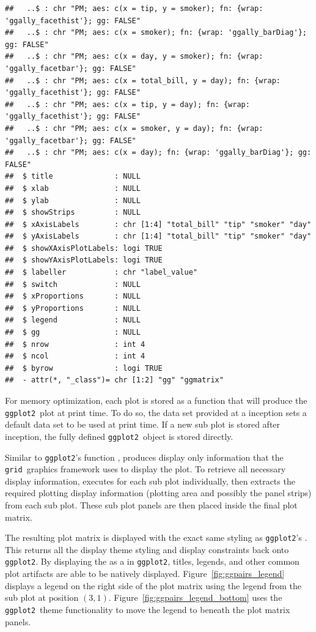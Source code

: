 \documentclass[stat,dissertation]{puthesis}\usepackage[]{graphicx}\usepackage{xcolor}
\makeatletter
\newenvironment{kframe}{%
 \def\at@end@of@kframe{}%
 \ifinner\ifhmode%
  \def\at@end@of@kframe{\end{minipage}}%
  \begin{minipage}{\columnwidth}%
 \fi\fi%
 \def\FrameCommand##1{\hskip\@totalleftmargin \hskip-\fboxsep
 \colorbox{shadecolor}{##1}\hskip-\fboxsep
     \hskip-\linewidth \hskip-\@totalleftmargin \hskip\columnwidth}%
 \MakeFramed {\advance\hsize-\width
   \@totalleftmargin\z@ \linewidth\hsize
   \@setminipage}}%
 {\par\unskip\endMakeFramed%
 \at@end@of@kframe}
\newenvironment{knitrout}{}{} %
\renewenvironment{knitrout}{\setstretch{1}}{}
\newcommand{\pkg}[1]{\texttt{#1}}
\newcommand{\ggplot}{\pkg{ggplot2}}
\makeatother
\begin{document}
\begin{knitrout}
\begin{kframe}
\begin{verbatim}
##   ..$ : chr "PM; aes: c(x = tip, y = smoker); fn: {wrap: 'ggally_facethist'}; gg: FALSE"
##   ..$ : chr "PM; aes: c(x = smoker); fn: {wrap: 'ggally_barDiag'}; gg: FALSE"
##   ..$ : chr "PM; aes: c(x = day, y = smoker); fn: {wrap: 'ggally_facetbar'}; gg: FALSE"
##   ..$ : chr "PM; aes: c(x = total_bill, y = day); fn: {wrap: 'ggally_facethist'}; gg: FALSE"
##   ..$ : chr "PM; aes: c(x = tip, y = day); fn: {wrap: 'ggally_facethist'}; gg: FALSE"
##   ..$ : chr "PM; aes: c(x = smoker, y = day); fn: {wrap: 'ggally_facetbar'}; gg: FALSE"
##   ..$ : chr "PM; aes: c(x = day); fn: {wrap: 'ggally_barDiag'}; gg: FALSE"
##  $ title              : NULL
##  $ xlab               : NULL
##  $ ylab               : NULL
##  $ showStrips         : NULL
##  $ xAxisLabels        : chr [1:4] "total_bill" "tip" "smoker" "day"
##  $ yAxisLabels        : chr [1:4] "total_bill" "tip" "smoker" "day"
##  $ showXAxisPlotLabels: logi TRUE
##  $ showYAxisPlotLabels: logi TRUE
##  $ labeller           : chr "label_value"
##  $ switch             : NULL
##  $ xProportions       : NULL
##  $ yProportions       : NULL
##  $ legend             : NULL
##  $ gg                 : NULL
##  $ nrow               : int 4
##  $ ncol               : int 4
##  $ byrow              : logi TRUE
##  - attr(*, "_class")= chr [1:2] "gg" "ggmatrix"
\end{verbatim}
\end{kframe}
\end{knitrout}

For memory optimization, each plot is stored as a function that will produce the \ggplot~plot at print time.  To do so, the data set provided at a  inception sets a default data set to be used at print time.  If a new sub plot is stored after inception, the fully defined \ggplot~object is stored directly.

Similar to \ggplot's function ,  produces display only information that the \pkg{grid}~graphics framework uses to display the plot. To retrieve all necessary display information,  executes  for each sub plot individually, then extracts the required plotting display information (plotting area and possibly the panel strips) from each sub plot.  These sub plot panels are then placed inside the final plot matrix.

The resulting plot matrix is displayed with the exact same styling as \ggplot's . This returns all the display theme styling and display constraints back onto \ggplot.  By displaying the  as a  in \ggplot, titles, legends, and other common plot artifacts are able to be natively displayed.   Figure~\ref{fig:ggpairs_legend} displays a legend on the right side of the plot matrix using the legend from the sub plot at position $(3,1)$.  Figure~\ref{fig:ggpairs_legend_bottom} uses the \ggplot~theme functionality to move the legend to beneath the plot matrix panels.
\end{document}
